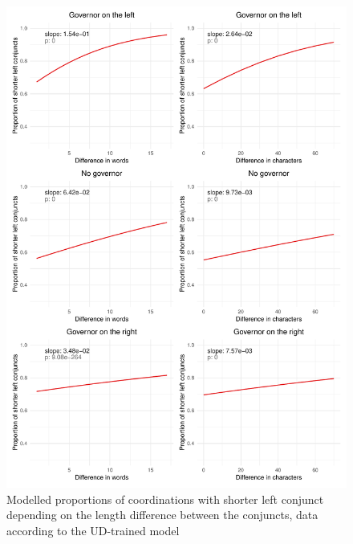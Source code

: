 \begin{figure}[hbt!]
    \includegraphics[width=\textwidth]{inputs/ud-modelled.pdf}
    \caption{\centering Modelled proportions of coordinations with shorter left conjunct depending on the length difference between the conjuncts, data according to the UD-trained model}\label{fig:ud-logit}
\end{figure}